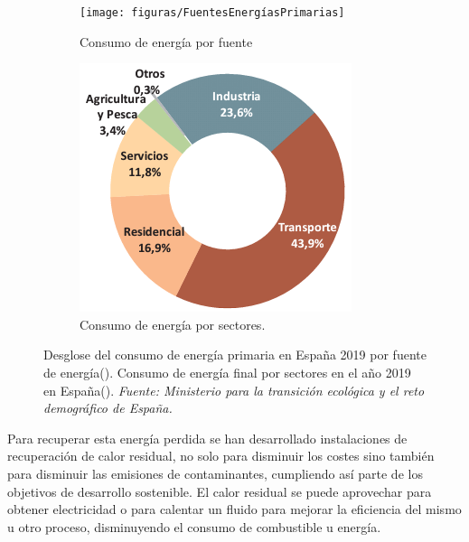 \begin{figure}[H]
	\centering
	\begin{subfigure}[b]{0.48\textwidth}
		\texttt{[image: figuras/FuentesEnergíasPrimarias]}
		\caption{Consumo de energía por fuente}
		\label{fig:fuentesenergiasprimarias}
	\end{subfigure}
	\hfill
	\begin{subfigure}[b]{0.48\textwidth}
		\centering
		\includegraphics[width=\textwidth]{figuras/consumoEnergiaFinalPorSectores_2019}
		\caption{Consumo de energía por sectores.}
		\label{fig:consumoenergiafinalporsectores2019}
	\end{subfigure}
\caption[]{Desglose del consumo de energía primaria en España 2019 por fuente de energía(). Consumo de energía final por sectores en el año 2019 en España(). \textit{Fuente:  Ministerio para la transición ecológica y el reto demográfico de España.} }
 \label{fig:consumosEnergiasCategorias}
\end{figure}

Para recuperar esta energía perdida se han desarrollado instalaciones de recuperación de calor residual, no solo para disminuir los costes sino también para disminuir las emisiones de contaminantes, cumpliendo así parte de los objetivos de desarrollo sostenible. El calor residual se puede aprovechar para obtener electricidad o para calentar un fluido para mejorar la eficiencia del mismo u otro proceso, disminuyendo el consumo de combustible u energía.\\

